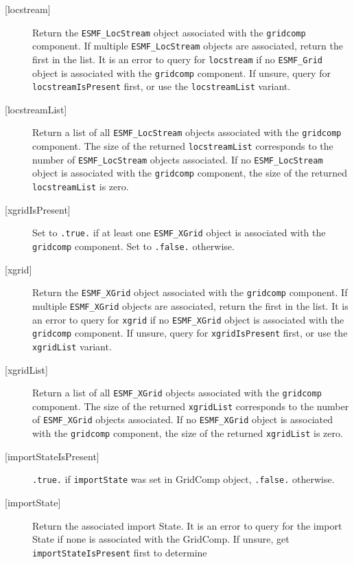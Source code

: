 \begin{description}
   \item[{[locstream]}]
   \begin{sloppypar}
     Return the {\tt ESMF\_LocStream} object associated with the {\tt gridcomp}
     component. If multiple {\tt ESMF\_LocStream} objects are associated, return
     the first in the list.
     It is an error to query for {\tt locstream} if no {\tt ESMF\_Grid} object is
     associated with the {\tt gridcomp} component.
     If unsure, query for {\tt locstreamIsPresent} first, or use the
     {\tt locstreamList} variant.
   \end{sloppypar}
   \item[{[locstreamList]}]
     Return a list of all {\tt ESMF\_LocStream} objects associated with the
     {\tt gridcomp} component. The size of the returned {\tt locstreamList}
     corresponds to the number of {\tt ESMF\_LocStream} objects associated.
     If no {\tt ESMF\_LocStream} object is associated with the {\tt gridcomp}
     component, the size of the returned {\tt locstreamList} is zero.
   \item[{[xgridIsPresent]}]
     Set to {\tt .true.} if at least one {\tt ESMF\_XGrid} object is
     associated with the {\tt gridcomp} component.
     Set to {\tt .false.} otherwise.
   \item[{[xgrid]}]
     Return the {\tt ESMF\_XGrid} object associated with the {\tt gridcomp}
     component. If multiple {\tt ESMF\_XGrid} objects are associated, return the
     first in the list.
     It is an error to query for {\tt xgrid} if no {\tt ESMF\_XGrid} object is
     associated with the {\tt gridcomp} component.
     If unsure, query for {\tt xgridIsPresent} first, or use the {\tt xgridList}
     variant.
   \item[{[xgridList]}]
     Return a list of all {\tt ESMF\_XGrid} objects associated with the
     {\tt gridcomp} component. The size of the returned {\tt xgridList}
     corresponds to the number of {\tt ESMF\_XGrid} objects associated.
     If no {\tt ESMF\_XGrid} object is associated with the {\tt gridcomp}
     component, the size of the returned {\tt xgridList} is zero.
   \item[{[importStateIsPresent]}]
     {\tt .true.} if {\tt importState} was set in GridComp object,
     {\tt .false.} otherwise.
   \item[{[importState]}]
     Return the associated import State.
     It is an error to query for the import State if none is associated with
     the GridComp. If unsure, get {\tt importStateIsPresent} first to determine

\end{description}
